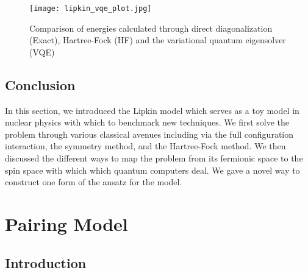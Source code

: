 \documentclass[10pt]{article}
\begin{document}
\begin{figure}
    \centering
    \texttt{[image: lipkin\_vqe\_plot.jpg]}
    \caption{Comparison of energies calculated through direct diagonalization (Exact), Hartree-Fock (HF) and the variational quantum eigensolver (VQE)}
    \label{fig:lipkin_vqe_plot}
\end{figure}



\section{Conclusion} In this section, we introduced the Lipkin model which serves as a toy model in nuclear physics with which to benchmark new techniques. We first solve the problem through various classical avenues including via the full configuration interaction, the symmetry method, and the Hartree-Fock method. We then discussed the different ways to map the problem from its fermionic space to the spin space with which which quantum computers deal. We gave a novel way to construct one form of the ansatz for the model.

\chapter{Pairing Model}
\label{chap:pairing_model}

\section{Introduction}
\end{document}
